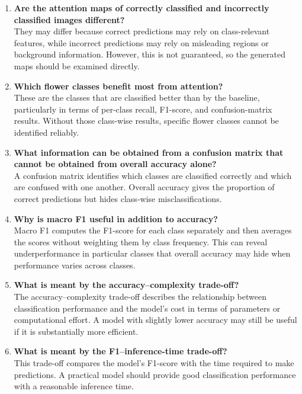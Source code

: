 \documentclass[10pt]{article}
\begin{document}
\begin{enumerate}
\item \textbf{Are the attention maps of correctly classified and incorrectly classified images different?}\\
They may differ because correct predictions may rely on class-relevant features, while incorrect predictions may rely on misleading regions or background information. However, this is not guaranteed, so the generated maps should be examined directly.

\item \textbf{Which flower classes benefit most from attention?}\\
These are the classes that are classified better than by the baseline, particularly in terms of per-class recall, F1-score, and confusion-matrix results. Without those class-wise results, specific flower classes cannot be identified reliably.

\item \textbf{What information can be obtained from a confusion matrix that cannot be obtained from overall accuracy alone?}\\
A confusion matrix identifies which classes are classified correctly and which are confused with one another. Overall accuracy gives the proportion of correct predictions but hides class-wise misclassifications.

\item \textbf{Why is macro F1 useful in addition to accuracy?}\\
Macro F1 computes the F1-score for each class separately and then averages the scores without weighting them by class frequency. This can reveal underperformance in particular classes that overall accuracy may hide when performance varies across classes.

\item \textbf{What is meant by the accuracy--complexity trade-off?}\\
The accuracy--complexity trade-off describes the relationship between classification performance and the model's cost in terms of parameters or computational effort. A model with slightly lower accuracy may still be useful if it is substantially more efficient.

\item \textbf{What is meant by the F1--inference-time trade-off?}\\
This trade-off compares the model's F1-score with the time required to make predictions. A practical model should provide good classification performance with a reasonable inference time.


\end{enumerate}
\end{document}

